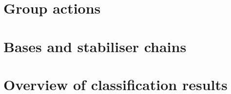 \section{Group actions}



\section{Bases and stabiliser chains}\label{sec:bases_stabiliser_chains}



\section{Overview of classification results}

